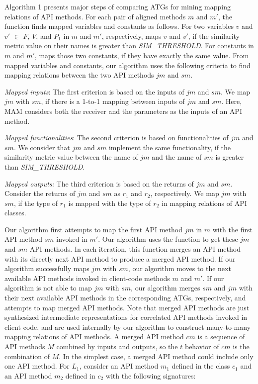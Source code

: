 Algorithm 1 presents major steps of comparing ATGs for mining
mapping relations of API methods. For each pair of aligned methods $m$ and $m'$, the  function finds mapped variables and constants as follows. For two variables $v$ and $v'$ $\in$ $F$, $V$, and $P_1$ in $m$ and $m'$, respectively,
 maps $v$ and $v'$, if the similarity metric value on their names is greater
than \emph{SIM\_THRESHOLD}. For constants in $m$ and $m'$, 
maps those two constants, if they have exactly the same
value. From mapped variables and constants, our algorithm uses the following criteria to find mapping relations between the two API methods $jm$ and $sm$.

\emph{Mapped inputs}: The first criterion is based on the inputs
of $jm$ and $sm$. We map $jm$ with $sm$, if there is a 1-to-1
mapping between inputs of $jm$ and $sm$. Here, MAM
considers both the receiver and the parameters as the inputs of an
API method.

\emph{Mapped functionalities}: The second criterion is based on functionalities of
$jm$ and $sm$. We consider that $jm$ and $sm$ implement the same functionality,
if the similarity metric value between the name of $jm$ and the name of $sm$ is
greater than \emph{SIM\_THRESHOLD}.

\emph{Mapped outputs:} The third criterion is based on the returns of $jm$ and $sm$.
Consider the returns of $jm$ and $sm$ as $r_1$ and $r_2$, respectively. We map $jm$
with $sm$, if the type of $r_1$ is mapped with the type of $r_2$ in
mapping relations of API classes.

Our algorithm first attempts to map the first API method $jm$ in $m$
with the first API method $sm$ invoked in $m'$. Our algorithm uses the 
function to get these $jm$ and $sm$ API methods. In each iteration, this function merges an API method with its directly next API method to produce a merged API method. If our algorithm successfully maps $jm$ with
$sm$, our algorithm moves to the next available API methods invoked in client-code methods $m$
and $m'$. If our algorithm is not able to map $jm$
with $sm$, our algorithm merges $sm$ and $jm$ with their next available API methods
in the corresponding ATGs, respectively, and attempts to map merged API methods. Note that merged API methods are just synthesized intermediate representations for correlated API methods invoked in client code, and are used internally by our algorithm to construct many-to-many mapping relations of API methods. A merged API method $cm$ is a sequence of API
methods $M$ combined by inputs and outputs, so the $t$ behavior of
$cm$ is the combination of $M$. In the simplest case, a merged API method could include
only one API method. For $L_1$, consider an API method $m_1$ defined in the class $c_1$ and an API method $m_2$ defined in $c_2$ with the following signatures:


